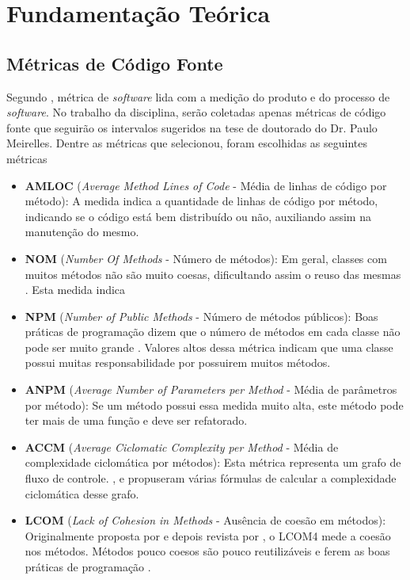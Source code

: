 \chapter[Fundamentação Teórica]{Fundamentação Teórica}

\section{Métricas de Código Fonte}

Segundo , métrica de \textit{software} lida com a medição do produto e do processo de \textit{software}. No trabalho da disciplina, serão coletadas apenas métricas de código fonte que seguirão os intervalos sugeridos na tese de doutorado do Dr. Paulo Meirelles. Dentre as métricas que  selecionou, foram escolhidas as seguintes métricas

\begin{itemize}
\item \textbf{AMLOC }(\textit{Average Method Lines of Code} - Média de linhas de código por método): A medida indica a quantidade de linhas de código por método, indicando se o código está bem distribuído ou não, auxiliando assim na manutenção do mesmo.
\item \textbf{NOM }(\textit{Number Of Methods} - Número de métodos): Em geral, classes com muitos métodos não são muito coesas, dificultando assim o reuso das mesmas \cite{lorenzkidd}. Esta medida indica
\item \textbf{NPM }(\textit{Number of Public Methods} - Número de métodos públicos): Boas práticas de programação dizem que o número de métodos em cada classe não pode ser muito grande \cite{beck}. Valores altos dessa métrica indicam que uma classe possui muitas responsabilidade por possuirem muitos métodos.
\item \textbf{ANPM }(\textit{Average Number of Parameters per Method} - Média de parâmetros por método): Se um método possui essa medida muito alta, este método pode ter mais de uma função e deve ser refatorado.
\item \textbf{ACCM }(\textit{Average Ciclomatic Complexity per Method} - Média de complexidade ciclomática por métodos): Esta métrica representa um grafo de fluxo de controle. ,  e  propuseram várias fórmulas de calcular a complexidade ciclomática desse grafo.
\item \textbf{LCOM }(\textit{Lack of Cohesion in Methods} - Ausência de coesão em métodos): Originalmente proposta por  e depois revista por , o LCOM4 mede a coesão nos métodos. Métodos pouco coesos são pouco reutilizáveis e ferem as boas práticas de programação \cite{beck}.
\end{itemize}
